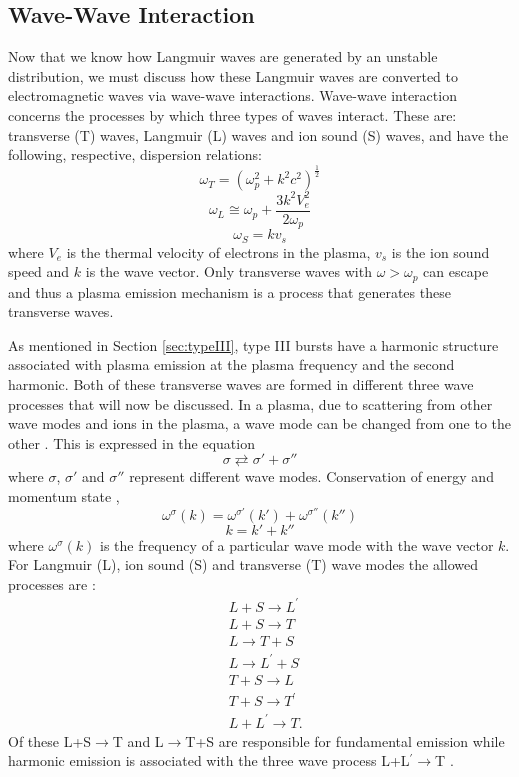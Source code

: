 \subsection{Wave-Wave Interaction}\label{Plasma Emission}
Now that we know how Langmuir waves are generated by an unstable distribution, we must discuss how these Langmuir waves are converted to electromagnetic waves via wave-wave interactions. Wave-wave interaction concerns the processes by which three types of waves interact. These are: transverse (T) waves, Langmuir (L) waves and ion sound (S) waves, and have the following, respective, dispersion relations:
$$ \omega_T=(\omega_p^2 +k^2c^2)^{\frac{1}{2}} $$
$$ \omega_L \cong \omega_p + \frac{3k^2V_e^2}{2 \omega_p}$$
$$ \omega_S = kv_s $$
where $V_e$ is the thermal velocity of electrons in the plasma, $v_s$ is the ion sound speed and $k$ is the wave vector. Only transverse waves with $\omega > \omega_p $ can escape and thus a plasma emission mechanism is a process that generates these transverse waves. 

As mentioned in Section \ref{sec:typeIII}, type III bursts have a harmonic structure associated with plasma emission at the plasma frequency and the second harmonic. Both of these transverse waves are formed in different three wave processes that will now be discussed.
In a plasma, due to scattering from other wave modes and ions in the plasma, a wave mode can be changed from one to the other \citep{McLean1985, Melrose1987}. This is expressed in the equation 
$$ \sigma \rightleftarrows \sigma' + \sigma '' $$
where $\sigma$, $\sigma'$  and  $\sigma ''$ represent different wave modes. Conservation of energy and momentum state \citep{McLean1985},
$$ \omega^{\sigma}(k)=\omega^{\sigma'}(k')+\omega^{\sigma''}(k'')$$
$$ k=k'+k''$$
where $ \omega^{\sigma}(k)$ is the frequency of a particular wave mode with the wave vector $k$. For Langmuir (L), ion sound (S) and transverse (T) wave modes the allowed processes are \citep{Melrose1987}:
\begin{align*}
& L+S \rightarrow L^\prime \\
& L+S \rightarrow T \\
& L \rightarrow T + S \\
& L \rightarrow L^\prime + S \\
& T+S \rightarrow L \\
& T+S\rightarrow T^\prime \\ 
& L+L^\prime \rightarrow T.
\end{align*}
Of these L+S$\rightarrow$T and L$\rightarrow$T+S are responsible for fundamental emission while harmonic emission is associated with the three wave process L+L$^\prime \rightarrow$T \citep{Melrose1987}.

